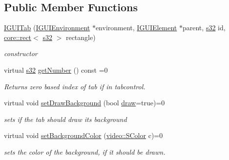 \subsection*{Public Member Functions}
\begin{DoxyCompactItemize}
\item 
\mbox{\label{classirr_1_1gui_1_1IGUITab_a27026e3a71397700290289ea206b0b86}} 
\hyperlink{classirr_1_1gui_1_1IGUITab_a27026e3a71397700290289ea206b0b86}{I\+G\+U\+I\+Tab} (\hyperlink{classirr_1_1gui_1_1IGUIEnvironment}{I\+G\+U\+I\+Environment} $\ast$environment, \hyperlink{classirr_1_1gui_1_1IGUIElement}{I\+G\+U\+I\+Element} $\ast$parent, \hyperlink{namespaceirr_ac66849b7a6ed16e30ebede579f9b47c6}{s32} id, \hyperlink{classirr_1_1core_1_1rect}{core\+::rect}$<$ \hyperlink{namespaceirr_ac66849b7a6ed16e30ebede579f9b47c6}{s32} $>$ rectangle)
\begin{DoxyCompactList}\small\item\em constructor \end{DoxyCompactList}\item 
virtual \hyperlink{namespaceirr_ac66849b7a6ed16e30ebede579f9b47c6}{s32} \hyperlink{classirr_1_1gui_1_1IGUITab_aedc76f9d93782188741ace78b32634f0}{get\+Number} () const =0
\begin{DoxyCompactList}\small\item\em Returns zero based index of tab if in tabcontrol. \end{DoxyCompactList}\item 
\mbox{\label{classirr_1_1gui_1_1IGUITab_a15aa82c853f4e72c1da37f556cd3b097}} 
virtual void \hyperlink{classirr_1_1gui_1_1IGUITab_a15aa82c853f4e72c1da37f556cd3b097}{set\+Draw\+Background} (bool \hyperlink{classirr_1_1gui_1_1IGUIElement_a1ef7eeaff67b8a9f4f37cacdc7e54be2}{draw}=true)=0
\begin{DoxyCompactList}\small\item\em sets if the tab should draw its background \end{DoxyCompactList}\item 
\mbox{\label{classirr_1_1gui_1_1IGUITab_aed83e8e69af7637cfd86380f6917a7de}} 
virtual void \hyperlink{classirr_1_1gui_1_1IGUITab_aed83e8e69af7637cfd86380f6917a7de}{set\+Background\+Color} (\hyperlink{classirr_1_1video_1_1SColor}{video\+::\+S\+Color} c)=0
\begin{DoxyCompactList}\small\item\em sets the color of the background, if it should be drawn. \end{DoxyCompactList}\item 

\end{DoxyCompactItemize}
